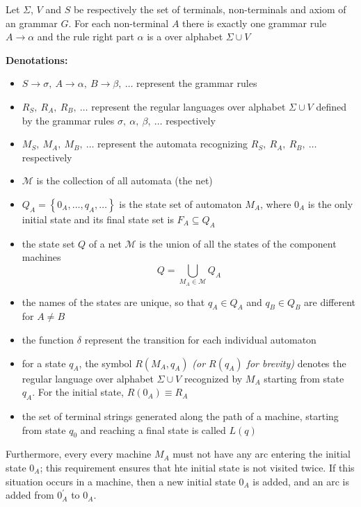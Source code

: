 \documentclass[english]{article}
\begin{document}
Let \(\Sigma\), \(V\) and \(S\) be respectively the set of terminals, non-terminals and axiom of an \EBNF grammar \(G\).
For each non-terminal \(A\) there is exactly one grammar rule \(A \rightarrow \alpha\) and the rule right part \(\alpha\) is a \re over alphabet \(\Sigma \cup V\)

\textbf{Denotations:}
\begin{itemize}
  \item \(S \rightarrow \sigma, \ A \rightarrow \alpha, \ B \rightarrow \beta, \ \ldots\) represent the grammar rules
  \item \(R_S, \ R_A, \ R_B, \ \ldots\) represent the regular languages over alphabet \(\Sigma \cup V\) defined by the grammar rules \(\sigma, \ \alpha, \ \beta, \ \ldots\) respectively
  \item \(M_S, \ M_A, \ M_B, \ \ldots\) represent the automata recognizing \(R_S, \ R_A, \ R_B, \ \ldots\) respectively
  \item \(\mathcal{M}\) is the collection of all automata (the net)
  \item \(Q_A = \left\{ 0_A, \ldots, q_A, \ldots \right\}\) is the state set of automaton \(M_A\), where \(0_A\) is the only initial state and its final state set is \(F_A \subseteq Q_A\)
  \item the state set \(Q\) of a net \(\mathcal{M}\) is the union of all the states of the component machines \[Q = \displaystyle \bigcup_{M_A \in \mathcal{M}} Q_A\]
  \item the names of the states are unique, so that \(q_A \in Q_A\) and \(q_B \in Q_B\) are different for \(A \neq B\)
  \item the function \(\delta\) represent the transition for each individual automaton
  \item for a state \(q_A\), the symbol \(R (M_A, q_A)\) \textit{(or \(R(q_A)\) for brevity)} denotes the regular language over alphabet \(\Sigma \cup V\) recognized by \(M_A\) starting from state \(q_A\). For the initial state, \(R(0_A) \equiv R_A\)
  \item the set of terminal strings generated along the path of a machine, starting from state \(q_0\) and reaching a final state is called \(L(q)\)
\end{itemize}

Furthermore, every every machine \(M_A\) must not have any arc entering the initial state \(0_A\); this requirement ensures that hte initial state is not visited twice.
If this situation occurs in a machine, then a new initial state \(0_A\) is added, and an arc is added from \(0^\prime_A\) to \(0_A\).
\end{document}
